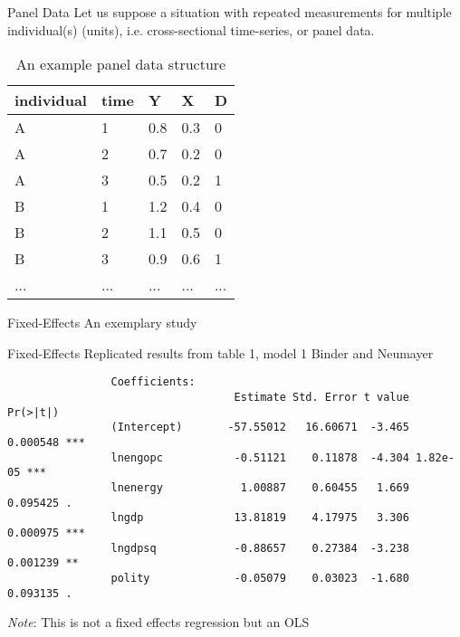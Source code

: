 \documentclass[aspectratio=169]{beamer}
\begin{document}
		\begin{frame}{Panel Data}
			Let us suppose a situation with repeated measurements for multiple individual(s) (units), i.e. cross-sectional time-series, or panel data.

			\begin{table}
				\caption{An example panel data structure}
				\footnotesize
				\begin{tabular}{|p{1.25cm}|p{1.5cm}|p{1.5cm}|p{1.5cm}||p{1.5cm}|}
					\hline
					\textbf{individual} & \textbf{time} & \textbf{Y} & \textbf{X} & \textbf{D} \\
					\hline
					A & 1 & 0.8 & 0.3 & 0 \\
					A & 2 & 0.7 & 0.2 & 0 \\
					A & 3 & 0.5 & 0.2 & 1 \\
					\hline
					B & 1 & 1.2 & 0.4 & 0 \\
					B & 2 & 1.1 & 0.5 & 0 \\
					B & 3 & 0.9 & 0.6 & 1 \\
					\hline
					{...} & {...} & {...} & {...} & {...} \\
					\hline
				\end{tabular}
			\end{table}
		\end{frame}

		\begin{frame}{Fixed-Effects}
			An exemplary study
			\begin{center}
			\end{center}
		\end{frame}

		\begin{frame}[fragile]{Fixed-Effects}
			Replicated results from table 1, model 1 Binder and Neumayer \citeyear{Binder2005}
			\begin{verbatim}
				Coefficients:
				                   Estimate Std. Error t value Pr(>|t|)
				(Intercept)       -57.55012   16.60671  -3.465 0.000548 ***
				lnengopc           -0.51121    0.11878  -4.304 1.82e-05 ***
				lnenergy            1.00887    0.60455   1.669 0.095425 .
				lngdp              13.81819    4.17975   3.306 0.000975 ***
				lngdpsq            -0.88657    0.27384  -3.238 0.001239 **
				polity             -0.05079    0.03023  -1.680 0.093135 .
			\end{verbatim}
			\footnotesize \textit{Note}: This is not a fixed effects regression but an OLS
		\end{frame}
\end{document}

